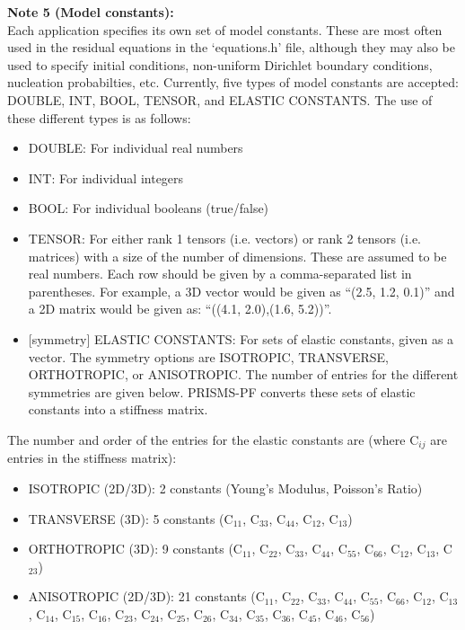 \documentclass[10pt]{article} %
\begin{document}
\textbf{Note 5 (Model constants):} \\
Each application specifies its own set of model constants. These are most often used in the residual equations in the `equations.h' file, although they may also be used to specify initial conditions, non-uniform Dirichlet boundary conditions, nucleation probabilties, etc. Currently, five types of model constants are accepted: DOUBLE, INT, BOOL, TENSOR, and ELASTIC CONSTANTS. The use of these different types is as follows:
\begin{itemize}
\item DOUBLE: For individual real numbers
\item INT: For individual integers
\item BOOL: For individual booleans (true/false)
\item TENSOR: For either rank 1 tensors (i.e. vectors) or rank 2 tensors (i.e. matrices) with a size of the number of dimensions. These are assumed to be real numbers. Each row should be given by a comma-separated list in parentheses. For example, a 3D vector would be given as ``(2.5, 1.2, 0.1)'' and a 2D matrix would be given as: ``((4.1, 2.0),(1.6, 5.2))''.
\item {[symmetry]} ELASTIC CONSTANTS: For sets of elastic constants, given as a vector. The symmetry options are ISOTROPIC, TRANSVERSE, ORTHOTROPIC, or ANISOTROPIC. The number of entries for the different symmetries are given below. PRISMS-PF converts these sets of elastic constants into a stiffness matrix.
\end{itemize}

The number and order of the entries for the elastic constants are (where C$_{ij}$ are entries in the stiffness matrix):
\begin{itemize}
\item ISOTROPIC (2D/3D): 2 constants (Young's Modulus, Poisson's Ratio)
\item TRANSVERSE (3D): 5 constants (C$_{11}$, C$_{33}$, C$_{44}$, C$_{12}$, C$_{13}$)
\item ORTHOTROPIC (3D): 9 constants (C$_{11}$, C$_{22}$, C$_{33}$, C$_{44}$, C$_{55}$, C$_{66}$, C$_{12}$, C$_{13}$, C$_{23}$)
\item ANISOTROPIC (2D/3D): 21 constants (C$_{11}$, C$_{22}$, C$_{33}$, C$_{44}$, C$_{55}$, C$_{66}$, C$_{12}$, C$_{13}$, C$_{14}$, C$_{15}$, C$_{16}$, C$_{23}$, C$_{24}$, C$_{25}$, C$_{26}$, C$_{34}$, C$_{35}$, C$_{36}$, C$_{45}$, C$_{46}$, C$_{56}$)
\end{itemize}
\end{document}
